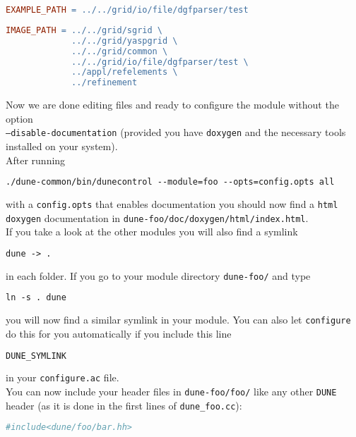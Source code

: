\documentclass[11pt,a4paper,headinclude,footinclude,DIV16,normalheadings]{scrartcl}
\newcommand{\dune}{\texttt{DUNE}\xspace}
\begin{document}
\begin{lstlisting}[language=make]
EXAMPLE_PATH = ../../grid/io/file/dgfparser/test 
\end{lstlisting}

\begin{lstlisting}[language=make]
IMAGE_PATH = ../../grid/sgrid \
             ../../grid/yaspgrid \
             ../../grid/common \
             ../../grid/io/file/dgfparser/test \
             ../appl/refelements \
             ../refinement
\end{lstlisting}

Now we are done editing files and ready to configure the module without the
option\\ \texttt{--disable-documentation} (provided you have \texttt{doxygen} and
the necessary tools installed on your system).\\
After running

\begin{lstlisting}[language=make]
./dune-common/bin/dunecontrol --module=foo --opts=config.opts all
\end{lstlisting}
with a \texttt{config.opts} that enables documentation you should now find a
\texttt{html} \texttt{doxygen} documentation in
\texttt{dune-foo/doc/doxygen/html/index.html}.\\

If you take a look at the other modules you will also find a symlink

\begin{lstlisting}[language=make]
dune -> .
\end{lstlisting}
in each folder. If you go to your module directory \texttt{dune-foo/} and
type

\begin{lstlisting}[language=make]
ln -s . dune
\end{lstlisting}
you will now find a similar symlink in your module. You can also let \texttt{configure} do this for you automatically if you include this line 
\begin{lstlisting}[language=make]
DUNE_SYMLINK
\end{lstlisting}
in your \texttt{configure.ac} file. \\
You can now include your header files in \texttt{dune-foo/foo/} like any other \dune header (as
it is done in the first lines of \texttt{dune\_foo.cc}):

\begin{lstlisting}[language=make]
#include<dune/foo/bar.hh>
\end{lstlisting}
\end{document}
